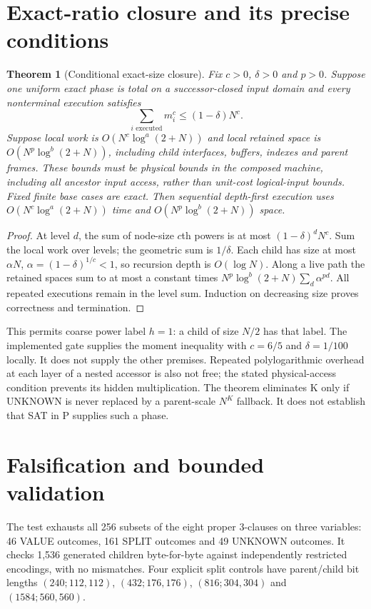 \documentclass[11pt]{article}
\newtheorem{theorem}{Theorem}
\begin{document}
\section{Exact-ratio closure and its precise conditions}
\begin{theorem}[Conditional exact-size closure]
Fix $c>0$, $\delta>0$ and $p>0$. Suppose one uniform exact phase is total on
a successor-closed input domain and every nonterminal execution satisfies
\[
 \sum_{i\text{ executed}} m_i^c\le(1-\delta)N^c.
\]
Suppose local work is $O(N^c\log^a(2+N))$ and local retained space is
$O(N^p\log^b(2+N))$, including child interfaces, buffers, indexes and parent
frames. These bounds must be physical bounds in the composed machine,
including all ancestor input access, rather than unit-cost logical-input
bounds. Fixed finite base cases are exact. Then sequential depth-first
execution uses $O(N^c\log^a(2+N))$ time and
$O(N^p\log^b(2+N))$ space.
\end{theorem}
\begin{proof}
At level $d$, the sum of node-size $c$th powers is at most
$(1-\delta)^dN^c$. Sum the local work over levels; the geometric sum is
$1/\delta$. Each child has size at most
$\alpha N$, $\alpha=(1-\delta)^{1/c}<1$, so recursion depth is $O(\log N)$.
Along a live path the retained spaces sum to at most a constant times
$N^p\log^b(2+N)\sum_d\alpha^{pd}$. All repeated executions remain in the
level sum. Induction on decreasing size proves correctness and termination.
\end{proof}
This permits coarse power label $h=1$: a child of size $N/2$ has that label.
The implemented gate supplies the moment inequality with $c=6/5$ and
$\delta=1/100$ locally. It does not supply the other premises. Repeated
polylogarithmic overhead at each layer of a nested accessor is also not free;
the stated physical-access condition prevents its hidden multiplication.
The theorem eliminates K only if UNKNOWN is never replaced by a parent-scale
$N^K$ fallback. It does not establish that SAT in P supplies such a phase.

\section{Falsification and bounded validation}
The test exhausts all 256 subsets of the eight proper 3-clauses on three
variables: 46 VALUE outcomes, 161 SPLIT outcomes and 49 UNKNOWN outcomes.
It checks 1,536 generated children byte-for-byte against independently
restricted encodings, with no mismatches. Four explicit split controls have
parent/child bit lengths $(240;112,112)$, $(432;176,176)$,
$(816;304,304)$ and $(1584;560,560)$.
\end{document}
